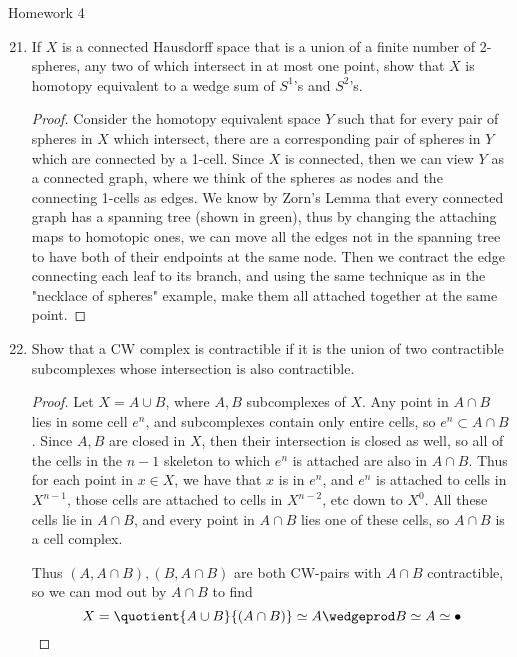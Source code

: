 \documentclass[12pt,letterpaper]{article}
\begin{document}
\pagestyle{fancy}
\begin{center}
{\Large Homework 4}%
\end{center}

\begin{enumerate}
\setcounter{enumi}{20}
\item  If $X$ is a connected Hausdorff space that is a union of a finite number of 2-spheres, any two of which intersect in at most one point, show that $X$ is homotopy equivalent to a wedge sum of $S^1$'s and $S^2$'s.
\begin{proof}
Consider the homotopy equivalent space $Y$ such that for every pair of spheres in $X$ which intersect, there are a corresponding pair of spheres in $Y$ which are connected by a 1-cell. Since $X$ is connected, then we can view $Y$ as a connected graph, where we think of the spheres as nodes and the connecting 1-cells as edges. 
We know by Zorn's Lemma that every connected graph has a spanning tree (shown in green), thus by changing the attaching maps to homotopic ones, we can move all the edges not in the spanning tree to have both of their endpoints at the same node. 
Then we contract the edge connecting each leaf to its branch, and using the same technique as in the "necklace of spheres" example, make them all attached together at the same point.
\vspace*{-5ex}
\end{proof}

\pagebreak
\setcounter{enumi}{22}
\item Show that a CW complex is contractible if it is the union of two contractible
subcomplexes whose intersection is also contractible.
\begin{proof}
Let $X=A \cup B$, where $A,B$ subcomplexes of $X$. Any point in $A\cap B$ lies in some cell $e^n$, and subcomplexes contain only entire cells, so $e^n\subset A\cap B$. Since $A,B$ are closed in $X$, then their intersection is closed as well, so all of the cells in the $n-1$ skeleton to which $e^n$ is attached are also in $A\cap B$. Thus for each point in $x\in X$, we have that $x$ is in $e^n$, and $e^n$ is attached to cells in $X^{n-1}$, those cells are attached to cells in $X^{n-2}$, etc down to $X^0$. All these cells lie in $A\cap B$, and every point in $A\cap B$ lies one of these cells, so $A \cap B$ is a cell complex. 

Thus $(A,A\cap B), (B,A\cap B)$ are both CW-pairs with $A\cap B$ contractible, so we can mod out by $A\cap B$ to find 
$$X=\quotient{A\cup B}{(A\cap B)}\simeq A\wedgeprod B\simeq A \simeq \bullet$$
\vspace*{-2ex}\phantom{.}
\end{proof}


\end{enumerate}
\end{document}
